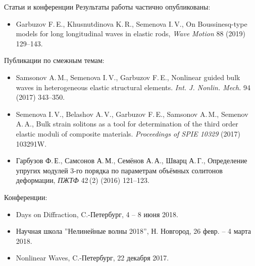 \documentclass{beamer}
\begin{document}
\begin{frame}{Статьи и конференции}
\small
Результаты работы частично опубликованы:
\footnotesize
\begin{itemize}
	\item Garbuzov F.\,E., Khusnutdinova K.\,R., Semenova I.\,V., On Boussinesq-type models for long longitudinal waves in elastic rods, \textit{Wave Motion} 88 (2019) 129--143.
\end{itemize}
\small
Публикации по смежным темам:
\footnotesize
\begin{itemize}
	\item Samsonov A.\,M., Semenova I.\,V., Garbuzov F.\,E.,  Nonlinear guided bulk waves in heterogeneous elastic structural elements. \textit{Int. J. Nonlin. Mech.} 94 (2017) 343--350.
	\item Semenova I.\,V., Belashov A.\,V., Garbuzov F.\,E., Samsonov A.\,M., Semenov A.\,A., Bulk strain solitons as a tool for determination of the third order elastic moduli of composite materials. \textit{Proceedings of SPIE 10329} (2017) 103291W.
	\item Гарбузов Ф.\,Е., Самсонов А.\,М., Семёнов А.\,А., Шварц А.\,Г., Определение упругих модулей	3-го порядка по параметрам объёмных солитонов деформации, \textit{ПЖТФ} 42\,(2) (2016) 121--123.
\end{itemize}
\small
Конференции:
\footnotesize
\begin{itemize}
	\item Days on Diffraction, C.-Петербург, 4 -- 8 июня 2018.
	\item Научная школа ''Нелинейные волны 2018'', Н. Новгород, 26 февр. -- 4 марта 2018.
	\item Nonlinear Waves, C.-Петербург, 22 декабря 2017.
\end{itemize}
\end{frame}
\end{document}
